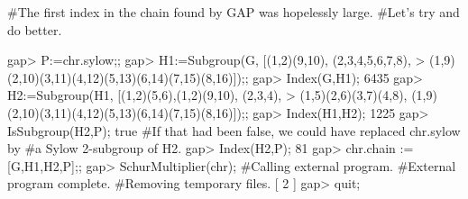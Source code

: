 #The first index in the chain found by GAP was hopelessly large.
#Let's try and do better.

gap> P:=chr.sylow;;
gap> H1:=Subgroup(G, [(1,2)(9,10), (2,3,4,5,6,7,8),
>                     (1,9)(2,10)(3,11)(4,12)(5,13)(6,14)(7,15)(8,16)]);;
gap> Index(G,H1);
6435
gap> H2:=Subgroup(H1, [(1,2)(5,6),(1,2)(9,10), (2,3,4),
>    (1,5)(2,6)(3,7)(4,8),  (1,9)(2,10)(3,11)(4,12)(5,13)(6,14)(7,15)(8,16)]);;
gap> Index(H1,H2);
1225
gap> IsSubgroup(H2,P);
true
#If that had been false, we could have replaced chr.sylow by
#a Sylow 2-subgroup of H2.
gap> Index(H2,P);
81
gap> chr.chain := [G,H1,H2,P];;
gap> SchurMultiplier(chr);
#Calling external program.
#External program complete.
#Removing temporary files.
[ 2 ]
gap> quit;
\endexample
